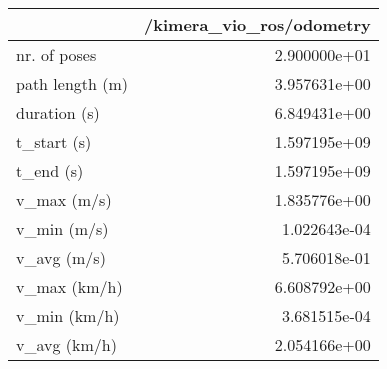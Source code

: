 \begin{tabular}{lr}
\toprule
{} &  /kimera\_vio\_ros/odometry \\
\midrule
nr. of poses    &              2.900000e+01 \\
path length (m) &              3.957631e+00 \\
duration (s)    &              6.849431e+00 \\
t\_start (s)     &              1.597195e+09 \\
t\_end (s)       &              1.597195e+09 \\
v\_max (m/s)     &              1.835776e+00 \\
v\_min (m/s)     &              1.022643e-04 \\
v\_avg (m/s)     &              5.706018e-01 \\
v\_max (km/h)    &              6.608792e+00 \\
v\_min (km/h)    &              3.681515e-04 \\
v\_avg (km/h)    &              2.054166e+00 \\
\bottomrule
\end{tabular}
